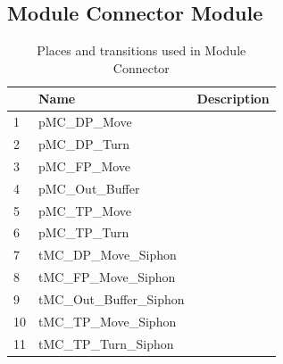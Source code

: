 \documentclass[runningheads,a4paper]{llncs}
\begin{document}
\subsection{Module Connector Module}
\begin{table}
	\caption{Places and transitions used in Module Connector}
	\begin{tabular}{|l|l|l|}
		\hline
		& Name & Description \\
		\hline
		1 & pMC\_DP\_Move             &  \\ \hline
		2 & pMC\_DP\_Turn             &  \\ \hline
		3 & pMC\_FP\_Move             &  \\ \hline
		4 & pMC\_Out\_Buffer          &  \\ \hline
		5 & pMC\_TP\_Move             &  \\ \hline
		6 & pMC\_TP\_Turn             &  \\ \hline
		7 & tMC\_DP\_Move\_Siphon     &  \\ \hline
		8 & tMC\_FP\_Move\_Siphon     &  \\ \hline
		9 & tMC\_Out\_Buffer\_Siphon  &  \\ \hline
		10 & tMC\_TP\_Move\_Siphon     &  \\ \hline
		11 & tMC\_TP\_Turn\_Siphon     &  \\ \hline
	\end{tabular}
\end{table}
\clearpage
\end{document}
